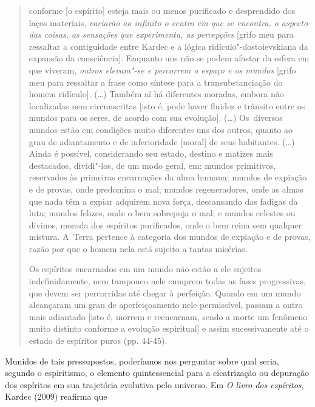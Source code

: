 \begin{quote}
conforme {[}o espírito{]} esteja mais ou menos purificado e desprendido
dos laços materiais, \emph{variarão ao infinito o centro em que se
encontra, o aspecto das coisas, as sensações que experimenta, as
percepções} {[}grifo meu para ressaltar a contiguidade entre Kardec e a
lógica ridículo"-dostoievskiana da expansão da consciência{]}. Enquanto
uns não se podem afastar da esfera em que viveram, \emph{outros
elevam"-se e percorrem o espaço e os mundos} {[}grifo meu para ressaltar
a frase como síntese para a transubstanciação do homem ridículo{]}.
(\ldots) Também aí há diferentes moradas, embora não localizadas nem
circunscritas {[}isto é, pode haver fluidez e trânsito entre os mundos
para os seres, de acordo com sua evolução{]}. (\ldots) Os~diversos mundos
estão em condições muito diferentes uns dos outros, quanto ao grau de
adiantamento e de inferioridade {[}moral{]} de seus habitantes. (\ldots)
Ainda é possível, considerando seu estado, destino e matizes mais
destacados, dividi"-los, de um modo geral, em: mundos primitivos,
reservados às primeiras encarnações da alma humana; mundos de expiação e
de provas, onde predomina o mal; mundos regeneradores, onde as almas que
nada têm a expiar adquirem nova força, descansando das fadigas da luta;
mundos felizes, onde o bem sobrepuja o mal; e mundos celestes ou
divinos, morada dos espíritos purificados, onde o bem reina sem qualquer
mistura. A~Terra pertence à categoria dos mundos de expiação e de
provas, razão por que o homem nela está sujeito a tantas misérias.

\noindent Os espíritos encarnados em um mundo não estão a ele sujeitos
indefinidamente, nem tampouco nele cumprem todas as fases progressivas,
que devem ser percorridas até chegar à perfeição. Quando em um mundo
alcançaram um grau de aperfeiçoamento nele permissível, passam a outro
mais adiantado {[}isto é, morrem e reencarnam, sendo a morte um fenômeno
muito distinto conforme a evolução espiritual{]} e assim sucessivamente
até o estado de espíritos puros (pp. 44-45).
\end{quote}



Munidos de tais pressupostos, poderíamos nos perguntar sobre qual seria,
segundo o espiritismo, o elemento quintessencial para a cicatrização ou
depuração dos espíritos em sua trajetória evolutiva pelo universo. Em
\emph{O livro dos espíritos}, Kardec (2009) reafirma que

